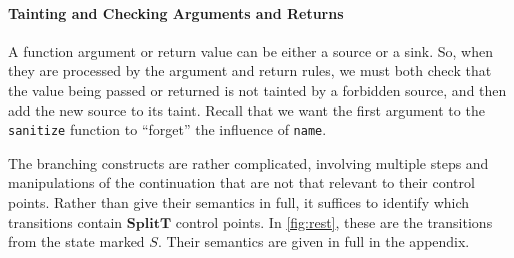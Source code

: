 \documentclass{llncs}
\begin{document}
\paragraph{Tainting and Checking Arguments and Returns}

A function argument or return value can be either a source or a sink.
So, when they are processed by the argument and return rules,
we must both check that the value being passed or returned is not tainted by a forbidden
source, and then add the new source to its taint. Recall that we want the first argument to
the {\tt sanitize} function to ``forget'' the influence of {\tt name}.





The branching constructs are rather complicated, involving multiple steps
and manipulations of the continuation that are not that relevant to their control
points. Rather than give their semantics in full, it suffices to identify which
transitions contain \(\mathbf{SplitT}\) control points. In \cref{fig:rest}, these
are the transitions from the state marked \(S\). Their semantics are given in full
in the appendix.
\end{document}
